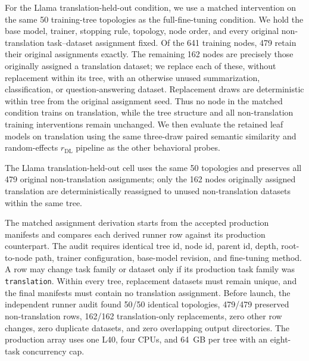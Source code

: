 
For the Llama translation-held-out condition, we use a matched intervention on
the same 50 training-tree topologies as the full-fine-tuning condition. We hold
the base model, trainer, stopping rule, topology, node order, and every original
non-translation task--dataset assignment fixed. Of the 641 training nodes, 479
retain their original assignments exactly. The remaining 162 nodes are precisely
those originally assigned a translation dataset; we replace each of these,
without replacement within its tree, with an otherwise unused summarization,
classification, or question-answering dataset. Replacement draws are
deterministic within tree from the original assignment seed. Thus no node in the
matched condition trains on translation, while the tree structure and all
non-translation training interventions remain unchanged. We then evaluate the
retained leaf models on translation using the same three-draw paired semantic
similarity and random-effects $r_{\mathrm{DL}}$ pipeline as the other behavioral
probes.

The Llama translation-held-out cell uses the same 50 topologies and preserves
all 479 original non-translation assignments; only the 162 nodes originally
assigned translation are deterministically reassigned to unused non-translation
datasets within the same tree.

The matched assignment derivation starts from the accepted production manifests
and compares each derived runner row against its production counterpart. The
audit requires identical tree id, node id, parent id, depth, root-to-node path,
trainer configuration, base-model revision, and fine-tuning method. A row may
change task family or dataset only if its production task family was
\texttt{translation}. Within every tree, replacement datasets must remain unique,
and the final manifests must contain no translation assignment. Before launch,
the independent runner audit found 50/50 identical topologies, 479/479 preserved
non-translation rows, 162/162 translation-only replacements, zero other row
changes, zero duplicate datasets, and zero overlapping output directories. The
production array uses one L40, four CPUs, and 64~GB per tree with an eight-task
concurrency cap.

